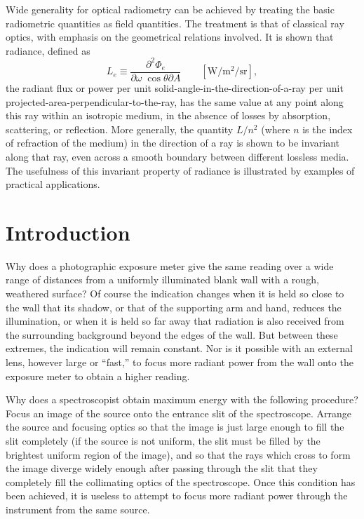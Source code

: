\begin{refsection}
\begin{center}
\vspace{6pt}
\begin{minipage}{.786\textwidth}
\small
Wide generality for optical radiometry can be achieved by treating the basic radiometric
quantities as field quantities. The treatment is that of classical ray optics,
with
emphasis on the geometrical relations involved. It is shown that radiance,
defined as
\begin{displaymath}
L_e \equiv \frac{\partial^2 \Phi_e}{\partial\omega \; \cos\theta\partial A}
\qquad \left[\unit{\watt\per\square\meter\per\steradian}\right],
\end{displaymath}
the radiant flux or power per unit solid-angle-in-the-direction-of-a-ray per
unit
projected-area-perpendicular-to-the-ray, has the same value at any point along this ray
within an isotropic medium, in the absence of losses by absorption, scattering, or
reflection. More generally, the quantity $L/n^2$ (where $n$ is the index of
refraction of
the medium) in the direction of a ray is shown to be invariant along that ray,
even across
a smooth boundary between different lossless media. The usefulness of this
invariant
property of radiance is illustrated by examples of practical applications.
\end{minipage}
\end{center}

\section{Introduction}

Why does a photographic exposure meter give the same reading over a wide range
of distances from a uniformly illuminated blank wall with a rough, weathered surface?
Of course the indication changes when it is held so close to the wall that its
shadow,
or that of the supporting arm and hand, reduces the illumination, or when it is
held
so far away that radiation is also received from the surrounding background beyond
the edges of the wall. But between these extremes, the indication will remain
constant.
Nor is it possible with an external lens, however large or “fast,” to focus more radiant
power from the wall onto the exposure meter to obtain a higher reading.

Why does a spectroscopist obtain maximum energy with the following procedure?
Focus an image of the source onto the entrance slit of the spectroscope.
Arrange the source and focusing optics so that the image is just large enough
to fill the slit completely (if the source is not uniform, the slit must be
filled by the brightest uniform region of the image), and so that the
rays which cross to form the image diverge widely enough after passing through
the slit that they completely fill the collimating optics of the
spectroscope. Once this condition has been achieved, it is useless to attempt
to focus more radiant power through the instrument from the same source.


\end{refsection}
